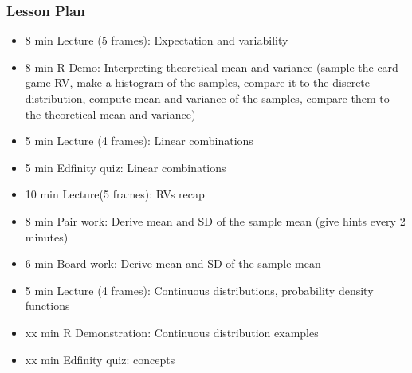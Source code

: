 \begin{frame}
    \frametitle{Lesson Plan}
    \begin{itemize}
        \item 8 min Lecture (5 frames): Expectation and variability
        \item 8 min R Demo: Interpreting theoretical mean and variance (sample the card game RV, make a histogram of the samples, compare it to the discrete distribution, compute mean and variance of the samples, compare them to the theoretical mean and variance)
        \item 5 min Lecture (4 frames): Linear combinations
        \item 5 min Edfinity quiz: Linear combinations

        \item 10 min Lecture(5 frames): RVs recap
        \item 8 min Pair work: Derive mean and SD of the sample mean (give hints every 2 minutes)
        \item 6 min Board work: Derive mean and SD of the sample mean
        
        \item 5 min Lecture (4 frames): Continuous distributions, probability density functions
        \item xx min R Demonstration: Continuous distribution examples
        \item xx min Edfinity quiz: concepts
    \end{itemize}
\end{frame}

